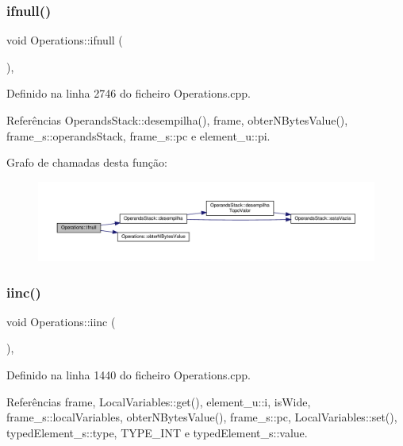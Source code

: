 \subsubsection{\texorpdfstring{ifnull()}{ifnull()}}
{\footnotesize\ttfamily void Operations\+::ifnull (\begin{DoxyParamCaption}{ }\end{DoxyParamCaption})\hspace{0.3cm}{\ttfamily [static]}, {\ttfamily [private]}}



Definido na linha 2746 do ficheiro Operations.\+cpp.



Referências Operands\+Stack\+::desempilha(), frame, obter\+N\+Bytes\+Value(), frame\+\_\+s\+::operands\+Stack, frame\+\_\+s\+::pc e element\+\_\+u\+::pi.

Grafo de chamadas desta função\+:\nopagebreak
\begin{figure}[H]
\begin{center}
\leavevmode
\includegraphics[width=350pt]{classOperations_a030f5995f8f357254e543d0cbce2d189_cgraph}
\end{center}
\end{figure}
\mbox{\label{classOperations_a9934f9369192b10a978c7d6950592c42}} 
\subsubsection{\texorpdfstring{iinc()}{iinc()}}
{\footnotesize\ttfamily void Operations\+::iinc (\begin{DoxyParamCaption}{ }\end{DoxyParamCaption})\hspace{0.3cm}{\ttfamily [static]}, {\ttfamily [private]}}



Definido na linha 1440 do ficheiro Operations.\+cpp.



Referências frame, Local\+Variables\+::get(), element\+\_\+u\+::i, is\+Wide, frame\+\_\+s\+::local\+Variables, obter\+N\+Bytes\+Value(), frame\+\_\+s\+::pc, Local\+Variables\+::set(), typed\+Element\+\_\+s\+::type, T\+Y\+P\+E\+\_\+\+I\+NT e typed\+Element\+\_\+s\+::value.

